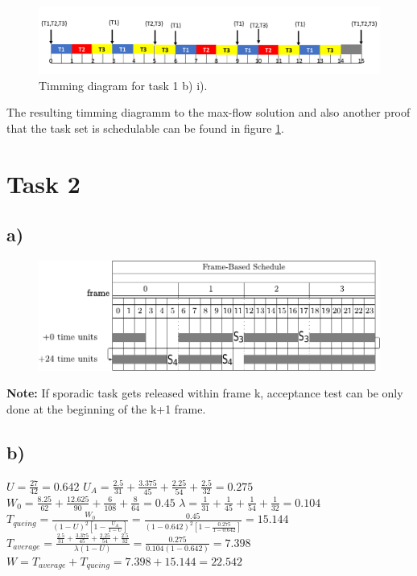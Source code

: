 \documentclass[10pt,a4paper]{article}
\begin{document}
\begin{figure}[h]
\includegraphics[width=\linewidth]{1b-timming-diagram.pdf}
\caption{Timming diagram for task 1 b) i).}
\label{fig:1biTimming}
\end{figure}

The resulting timming diagramm to the max-flow solution and also another proof that the task set is schedulable can be found in figure \ref{fig:1biTimming}.
\newpage
\section*{Task 2}
\subsection*{a)}

\begin{figure}[h]
\includegraphics[width=\linewidth]{2a.pdf}
\label{fig:2a}
\end{figure}

\textbf{Note:} If sporadic task gets released within frame k, acceptance test can be only done at the beginning of the k+1 frame.

\subsection*{b)}
$U = \frac{27}{42} = 0.642$
\newline
$U_A = \frac{2.5}{31} + \frac{3.375}{45} + \frac{2.25}{54} + \frac{2.5}{32} = 0.275$
\newline
$W_0 = \frac{8.25}{62} + \frac{12.625}{90} + \frac{6}{108} + \frac{8}{64} = 0.45$
\newline
$\lambda = \frac{1}{31} + \frac{1}{45} + \frac{1}{54} + \frac{1}{32} = 0.104$
\newline
$T_{queing} = \frac{W_0}{(1-U)^2[1 - \frac{U_A}{1 - U}]} = \frac{0.45}{(1-0.642)^2[1 - \frac{0.275}{1 - 0.642}]} = 15.144$
\newline
$T_{average} = \frac{\frac{2.5}{31} + \frac{3.375}{45} + \frac{2.25}{54} + \frac{2.5}{32}}{\lambda(1 - U)} = \frac{0.275}{0.104(1 - 0.642)} = 7.398$
\newline
$W = T_{average} + T_{queing} = 7.398 + 15.144 = 22.542$
\end{document}
